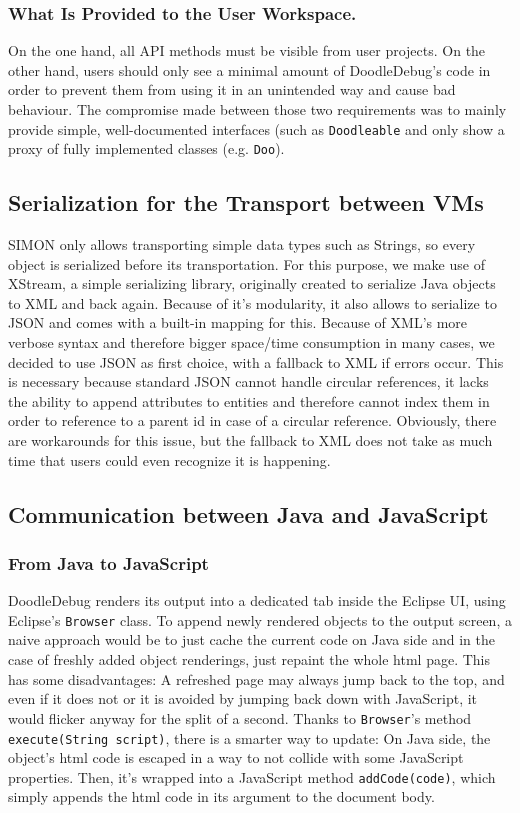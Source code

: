 \documentclass[english]{acm_proc_article-sp}
\newcommand{\nb}[2]{\nbc{#1}{#2}{orange}}
\newcommand\todo[1]{\nb{TO DO}{#1}}
\begin{document}
\subsubsection{What Is Provided to the User Workspace.}
On the one hand, all API methods must be visible from user projects. On the other hand, users should only see a minimal amount of DoodleDebug's code in order to prevent them from using it in an unintended way and cause bad behaviour. The compromise made between those two requirements was to mainly provide simple, well-documented interfaces (such as \verb-Doodleable- and only show a proxy of fully implemented classes (e.g. \verb-Doo-).

\subsection{Serialization for the Transport between VMs}
SIMON only allows transporting simple data types such as Strings, so every object is serialized before its transportation. For this purpose, we make use of XStream\cite{xstream}, a simple serializing library, originally created to serialize Java objects to XML and back again. Because of it's modularity, it also allows to serialize to JSON and comes with a built-in mapping for this. Because of XML's more verbose syntax and therefore bigger space/time consumption in many cases, we decided to use JSON as first choice, with a fallback to XML if errors occur. This is necessary because standard JSON cannot handle circular references, it lacks the ability to append attributes to entities and therefore cannot index them in order to reference to a parent id in case of a circular reference. Obviously, there are workarounds for this issue, but the fallback to XML does not take as much time that users could even recognize it is happening.

\todo{Maybe simple benchmark of XML vs. JSON here}

\subsection{Communication between Java and JavaScript}
\subsubsection{From Java to JavaScript}
DoodleDebug renders its output into a dedicated tab inside the Eclipse UI, using Eclipse's \verb.Browser. class. To append newly rendered objects to the output screen, a naive approach would be to just cache the current code on Java side and in the case of freshly added object renderings, just repaint the whole html page. This has some disadvantages: A refreshed page may always jump back to the top, and even if it does not or it is avoided by jumping back down with JavaScript, it would flicker anyway for the split of a second. Thanks to \verb.Browser.'s method \verb.execute(String script)., there is a smarter way to update: On Java side, the object's html code is escaped in a way to not collide with some JavaScript properties. Then, it's wrapped into a JavaScript method \verb.addCode(code)., which simply appends the html code in its argument to the document body.
\end{document}
